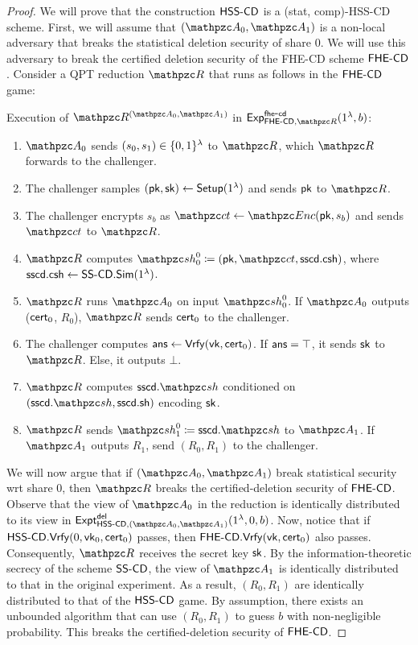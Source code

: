 \begin{proof}
We will prove that the construction $\mathsf{HSS\textrm{-}CD}$ is a (stat,
comp)-HSS-CD scheme. First, we will assume that $(\qA_0, \qA_1)$ is
a non-local adversary that breaks the statistical deletion
security of share $0$. We will use this adversary to break the
certified deletion security of the FHE-CD scheme $\mathsf{FHE\textrm{-}CD}$. Consider
a QPT reduction $\qR$ that runs as follows in the $\mathsf{FHE\textrm{-}CD}$ game:

\begin{description}
\item Execution of $\qR^{(\qA_0, \qA_1)}$ in
$\expb{\FHEcd,\qR}{fhe}{cd}(1^\secp,b)$:
\begin{enumerate}
\item $\qA_0$ sends $(s_0, s_1) \in \{0,1\}^\lambda$ to $\qR$, which
$\qR$ forwards to the challenger.
\item The challenger samples $(\mathsf{pk}, \mathsf{sk}) \leftarrow
\mathsf{Setup}(1^\lambda)$ and sends $\mathsf{pk}$ to $\qR$.
\item The challenger encrypts $s_b$ as $\qct \leftarrow \qEnc(\pk,
s_b)$ and sends $\qct$ to $\qR$.
\item $\qR$ computes $\qsh_0^0 \seteq (\pk, \qct, \sscd.\csh)$,
where $\mathsf{ss}\mathsf{cd}.\mathsf{csh} \leftarrow \mathsf{SS\textrm{-}CD}.\mathsf{Sim}(1^\lambda)$.
\item $\qR$ runs $\qA_0$ on input $\qsh_0^0$. If $\qA_0$ outputs
($\mathsf{cert}_0$, $R_0$), $\qR$ sends $\mathsf{cert}_0$ to the challenger.
\item The challenger computes $\mathsf{ans} \leftarrow \mathsf{Vrfy}(\mathsf{vk}, \mathsf{cert}_0)$.
If $\mathsf{ans} = \top$, it sends $\mathsf{sk}$ to $\qR$. Else, it outputs $\bot$.
\item $\qR$ computes $\sscd.\qsh$ conditioned on $(\sscd.\qsh,
\sscd.\sh)$ encoding $\mathsf{sk}$.
\item $\qR$ sends $\qsh_1^0 \seteq \sscd.\qsh$ to $\qA_1$. If
$\qA_1$ outputs $R_1$, send $(R_0, R_1)$ to the challenger.
\end{enumerate}
\end{description}

We will now argue that if $(\qA_0, \qA_1)$ break statistical
security wrt share 0, then $\qR$ breaks the certified-deletion
security of $\mathsf{FHE\textrm{-}CD}$. Observe that the view of $\qA_0$ in the
reduction is identically distributed to its view in $\expa{\HSScd,
(\qA_0, \qA_1)}{del}(1^\secp, 0, b)$. Now, notice that if
$\mathsf{HSS\textrm{-}CD}.\mathsf{Vrfy}(0, \mathsf{vk}_0, \mathsf{cert}_0)$ passes, then $\mathsf{FHE\textrm{-}CD}.\mathsf{Vrfy}(\mathsf{vk},
\mathsf{cert}_0)$ also passes.  Consequently, $\qR$ receives the secret key
$\mathsf{sk}$. By the information-theoretic secrecy of the scheme $\mathsf{SS\textrm{-}CD}$,
the view of $\qA_1$ is identically distributed to that in the
original experiment. As a result, $(R_0, R_1)$ are identically
distributed to that of the $\mathsf{HSS\textrm{-}CD}$ game. By assumption, there
exists an unbounded algorithm that can use $(R_0, R_1)$ to guess $b$
with non-negligible probability. This breaks the certified-deletion
security of $\mathsf{FHE\textrm{-}CD}$.


\end{proof}
